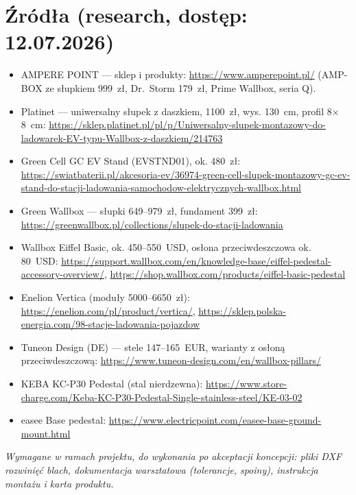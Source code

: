 \documentclass[11pt,a4paper]{article}
\begin{document}
\section*{Źródła (research, dostęp: 12.07.2026)}
\begin{itemize}\small
\item AMPERE POINT --- sklep i produkty: \url{https://www.amperepoint.pl/} (AMP-BOX ze słupkiem 999~zł,
Dr.~Storm 179~zł, Prime Wallbox, seria Q).
\item Platinet --- uniwersalny słupek z daszkiem, 1100~zł, wys. 130~cm, profil 8$\times$8~cm:
\url{https://sklep.platinet.pl/pl/p/Uniwersalny-slupek-montazowy-do-ladowarek-EV-typu-Wallbox-z-daszkiem/214763}
\item Green Cell GC EV Stand (EVSTND01), ok. 480~zł: \url{https://swiatbaterii.pl/akcesoria-ev/36974-green-cell-slupek-montazowy-gc-ev-stand-do-stacji-ladowania-samochodow-elektrycznych-wallbox.html}
\item Green Wallbox --- słupki 649--979~zł, fundament 399~zł:
\url{https://greenwallbox.pl/collections/slupek-do-stacji-ladowania}
\item Wallbox Eiffel Basic, ok. 450--550~USD, osłona przeciwdeszczowa ok. 80~USD:
\url{https://support.wallbox.com/en/knowledge-base/eiffel-pedestal-accessory-overview/},
\url{https://shop.wallbox.com/products/eiffel-basic-pedestal}
\item Enelion Vertica (moduły 5000--6650~zł): \url{https://enelion.com/pl/product/vertica/},
\url{https://sklep.polska-energia.com/98-stacje-ladowania-pojazdow}
\item Tuneon Design (DE) --- stele 147--165~EUR, warianty z osłoną przeciwdeszczową:
\url{https://www.tuneon-design.com/en/wallbox-pillars/}
\item KEBA KC-P30 Pedestal (stal nierdzewna): \url{https://www.store-charge.com/Keba-KC-P30-Pedestal-Single-stainless-steel/KE-03-02}
\item easee Base pedestal: \url{https://www.electricpoint.com/easee-base-ground-mount.html}
\end{itemize}

\vspace{0.6em}
\noindent\textit{Wymagane w ramach projektu, do wykonania po akceptacji koncepcji: pliki DXF
rozwinięć blach, dokumentacja warsztatowa (tolerancje, spoiny), instrukcja montażu i karta produktu.}
\end{document}
